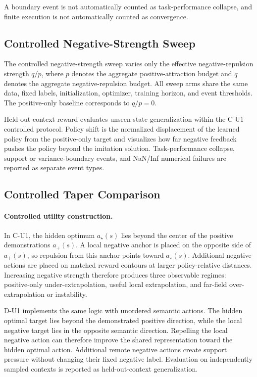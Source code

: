 \documentclass[sigconf,anonymous,review]{acmart}
\theoremstyle{acmdefinition}
\begin{document}
A boundary event is not automatically counted as task-performance
collapse, and finite execution is not automatically counted as
convergence.

\subsection{Controlled Negative-Strength Sweep}
\label{app:negative_strength_sweep}

The controlled negative-strength sweep varies only the effective
negative-repulsion strength $q/p$, where $p$ denotes the aggregate
positive-attraction budget and $q$ denotes the aggregate
negative-repulsion budget. All sweep arms share the same data, fixed
labels, initialization, optimizer, training horizon, and event
thresholds. The positive-only baseline corresponds to $q/p=0$.

Held-out-context reward evaluates unseen-state generalization within the
C-U1 controlled protocol. Policy shift is the normalized displacement of
the learned policy from the positive-only target and visualizes how far
negative feedback pushes the policy beyond the imitation solution.
Task-performance collapse, support or variance-boundary events, and
NaN/Inf numerical failures are reported as separate event types.


\subsection{Controlled Taper Comparison}
\label{app:controlled_taper_protocol}

\paragraph{Controlled utility construction.}
In C-U1, the hidden optimum $a_\star(s)$ lies beyond the center of the
positive demonstrations $a_+(s)$. A local negative anchor is placed on
the opposite side of $a_+(s)$, so repulsion from this anchor points
toward $a_\star(s)$. Additional negative actions are placed on matched
reward contours at larger policy-relative distances. Increasing
negative strength therefore produces three observable regimes:
positive-only under-extrapolation, useful local extrapolation, and
far-field over-extrapolation or instability.

D-U1 implements the same logic with unordered semantic actions. The
hidden optimal target lies beyond the demonstrated positive direction,
while the local negative target lies in the opposite semantic
direction. Repelling the local negative action can therefore improve
the shared representation toward the hidden optimal action. Additional
remote negative actions create support pressure without changing their
fixed negative label. Evaluation on independently sampled contexts is
reported as held-out-context generalization.
\end{document}
